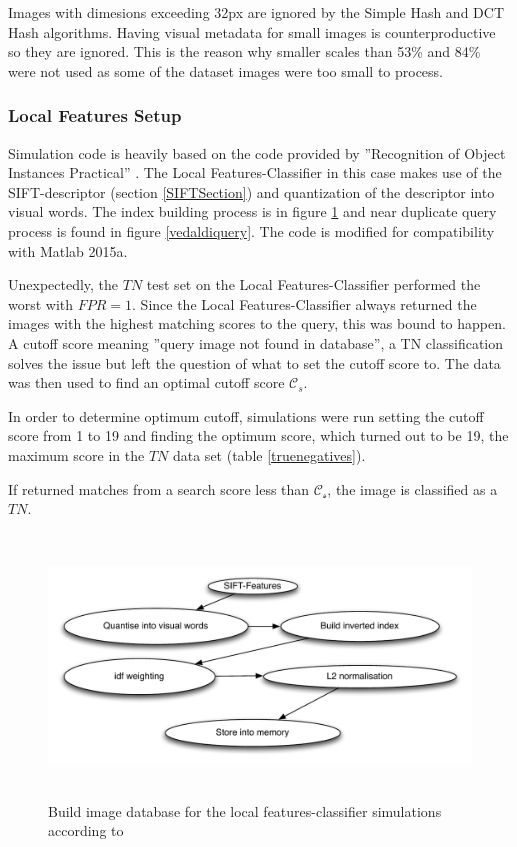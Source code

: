 \documentclass[english,12pt,a4paper,pdftex,elec,utf8]{aaltothesis}
\begin{document}
Images with dimesions exceeding 32px are ignored by the Simple Hash and DCT Hash algorithms. Having visual metadata for small images is counterproductive so they are ignored. This is the reason why smaller scales than 53\% and 84\% were not used as some of the dataset images were too small to process.

\subsubsection{Local Features Setup}
Simulation code is heavily based on the code provided by ''Recognition of Object Instances Practical'' \cite{Vedaldi2012}. The Local Features-Classifier in this case makes use of the SIFT-descriptor (section \ref{SIFTSection}) and quantization of the descriptor into visual words. The index building process is in figure \ref{vedaldigenindex} and near duplicate query process is found in figure \ref{vedaldiquery}. The code is modified for compatibility with Matlab 2015a.

Unexpectedly, the $TN$ test set on the Local Features-Classifier performed the worst with $FPR = 1$. Since the Local Features-Classifier always returned the images with the highest matching scores to the query, this was bound to happen. A cutoff score meaning ''query image not found in database'', a TN classification solves the issue but left the question of what to set the cutoff score to. The data was then used to find an optimal cutoff score $\mathcal{C}_s$.

In order to determine optimum cutoff, simulations were run setting the cutoff score from 1 to 19 and finding the optimum score, which turned out to be 19, the maximum score in the $TN$ data set (table \ref{truenegatives}).

If returned matches from a search score less than $\mathcal{C_s}$, the image is classified as a $TN$.

\begin{figure}[htb]
\begin{center}
  \includegraphics[height=7cm]{figures/vedaldigenindex}
\end{center}
\caption{Build image database for the local features-classifier simulations according to \cite{Vedaldi2012}}
\label{vedaldigenindex}
\end{figure}
\end{document}
